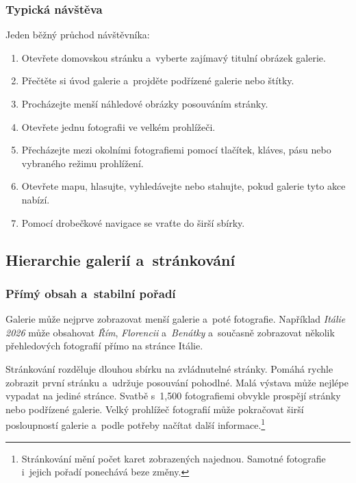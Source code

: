 \documentclass[11pt,a4paper]{article}
\begin{document}
\subsubsection{Typická návštěva}

Jeden běžný průchod návštěvníka:

\begin{enumerate}
  \item Otevřete domovskou stránku a~vyberte zajímavý titulní obrázek galerie.
  \item Přečtěte si úvod galerie a~projděte podřízené galerie nebo štítky.
  \item Procházejte menší náhledové obrázky posouváním stránky.
  \item Otevřete jednu fotografii ve velkém prohlížeči.
  \item Přecházejte mezi okolními fotografiemi pomocí tlačítek, kláves, pásu
  nebo vybraného režimu prohlížení.
  \item Otevřete mapu, hlasujte, vyhledávejte nebo stahujte, pokud galerie tyto
  akce nabízí.
  \item Pomocí drobečkové navigace se vraťte do širší sbírky.
\end{enumerate}

\subsection{Hierarchie galerií a~stránkování}

\subsubsection{Přímý obsah a~stabilní pořadí}

Galerie může nejprve zobrazovat menší galerie a~poté fotografie. Například
\emph{Itálie 2026} může obsahovat \emph{Řím}, \emph{Florencii} a~\emph{Benátky}
a~současně zobrazovat několik přehledových fotografií přímo na stránce Itálie.

Stránkování rozděluje dlouhou sbírku na zvládnutelné stránky. Pomáhá rychle
zobrazit první stránku a~udržuje posouvání pohodlné. Malá výstava může nejlépe
vypadat na jediné stránce. Svatbě s~1,500 fotografiemi obvykle prospějí stránky
nebo podřízené galerie. Velký prohlížeč fotografií může pokračovat širší
posloupností galerie a~podle potřeby načítat další
informace.\footnote{Stránkování mění počet karet zobrazených najednou. Samotné
fotografie i~jejich pořadí ponechává beze změny.}
\end{document}
